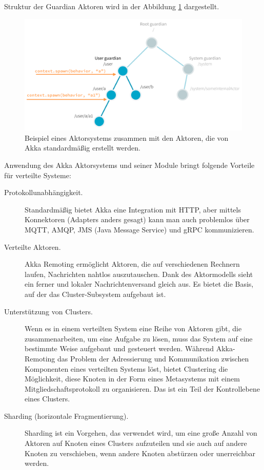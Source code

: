 Struktur der Guardian Aktoren wird in der Abbildung \ref{fig:akkaActors} dargestellt.

\begin{figure}
	\centering
	\includegraphics[width=0.7\linewidth]{images/3_akka_actors}
	\caption{Beispiel eines Aktorsystems zusammen mit den Aktoren, die von Akka standardmäßig erstellt werden.}
	\label{fig:akkaActors}
\end{figure}

Anwendung des Akka Aktorsystems und seiner Module bringt folgende Vorteile für verteilte Systeme:

\begin{description} 
	\item[Protokollunabhängigkeit.] Standardmäßig bietet Akka eine Integration mit HTTP, aber mittels Konnektoren (Adapters anders gesagt) kann man auch problemlos über MQTT, AMQP, JMS (Java Message Service) und gRPC kommunizieren.
	
	\item[Verteilte Aktoren.] Akka Remoting ermöglicht Aktoren, die auf verschiedenen Rechnern laufen, Nachrichten nahtlos auszutauschen. Dank des Aktormodells sieht ein ferner und lokaler Nachrichtenversand gleich aus. Es bietet die Basis, auf der das Cluster-Subsystem aufgebaut ist.
	
	\item[Unterstützung von Clusters.] Wenn es in einem verteilten System eine Reihe von Aktoren gibt, die zusammenarbeiten, um eine Aufgabe zu lösen, muss das System auf eine bestimmte Weise aufgebaut und gesteuert werden. Während Akka-Remoting das Problem der Adressierung und Kommunikation zwischen Komponenten eines verteilten Systems löst, bietet Clustering die Möglichkeit, diese Knoten in der Form eines Metasystems mit einem Mitgliedschaftsprotokoll zu organisieren. Das ist ein Teil der Kontrollebene eines Clusters.
	
	\item[Sharding (horizontale Fragmentierung).] Sharding ist ein Vorgehen, das verwendet wird, um eine große Anzahl von Aktoren auf Knoten eines Clusters aufzuteilen und sie auch auf andere Knoten zu verschieben, wenn andere Knoten abstürzen oder unerreichbar werden.
\end{description}

